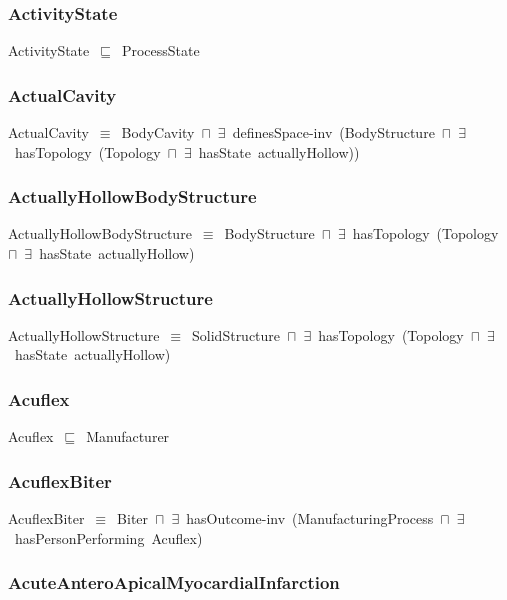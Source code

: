 \documentclass{article}
\begin{document}
\subsubsection*{ActivityState}

ActivityState~\ensuremath{\sqsubseteq}~ProcessState~

\subsubsection*{ActualCavity}

ActualCavity~\ensuremath{\equiv}~BodyCavity~\ensuremath{\sqcap}~\ensuremath{\exists}~definesSpace-inv~(BodyStructure~\ensuremath{\sqcap}~\ensuremath{\exists}~hasTopology~(Topology~\ensuremath{\sqcap}~\ensuremath{\exists}~hasState~actuallyHollow))

\subsubsection*{ActuallyHollowBodyStructure}

ActuallyHollowBodyStructure~\ensuremath{\equiv}~BodyStructure~\ensuremath{\sqcap}~\ensuremath{\exists}~hasTopology~(Topology~\ensuremath{\sqcap}~\ensuremath{\exists}~hasState~actuallyHollow)

\subsubsection*{ActuallyHollowStructure}

ActuallyHollowStructure~\ensuremath{\equiv}~SolidStructure~\ensuremath{\sqcap}~\ensuremath{\exists}~hasTopology~(Topology~\ensuremath{\sqcap}~\ensuremath{\exists}~hasState~actuallyHollow)

\subsubsection*{Acuflex}

Acuflex~\ensuremath{\sqsubseteq}~Manufacturer~

\subsubsection*{AcuflexBiter}

AcuflexBiter~\ensuremath{\equiv}~Biter~\ensuremath{\sqcap}~\ensuremath{\exists}~hasOutcome-inv~(ManufacturingProcess~\ensuremath{\sqcap}~\ensuremath{\exists}~hasPersonPerforming~Acuflex)

\subsubsection*{AcuteAnteroApicalMyocardialInfarction}
\end{document}
